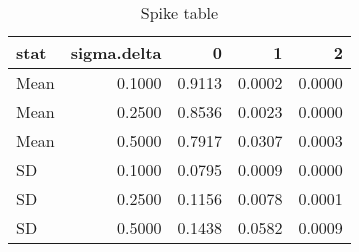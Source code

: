 \begin{table}[ht]
\centering
\begin{tabular}{lrrrr}
  \hline
stat & sigma.delta & 0 & 1 & 2 \\ 
  \hline
Mean & 0.1000 & 0.9113 & 0.0002 & 0.0000 \\ 
  Mean & 0.2500 & 0.8536 & 0.0023 & 0.0000 \\ 
  Mean & 0.5000 & 0.7917 & 0.0307 & 0.0003 \\ 
  SD & 0.1000 & 0.0795 & 0.0009 & 0.0000 \\ 
  SD & 0.2500 & 0.1156 & 0.0078 & 0.0001 \\ 
  SD & 0.5000 & 0.1438 & 0.0582 & 0.0009 \\ 
   \hline
\end{tabular}
\caption{Spike table} 
\end{table}
